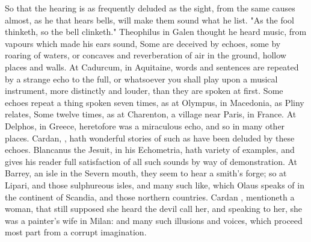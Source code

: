 {So that the hearing is as frequently deluded as the sight, from the same causes
almost, as he that hears bells, will make them sound what he list. "As the fool
thinketh, so the bell clinketh." Theophilus in Galen thought he heard music,
from vapours which made his ears sound, \etc{} Some are deceived by echoes,
some by roaring of waters, or concaves and reverberation of air in the ground,
hollow places and walls. At Cadurcum, in Aquitaine, words
and sentences are repeated by a strange echo to the full, or whatsoever you
shall play upon a musical instrument, more distinctly and louder, than they are
spoken at first. Some echoes repeat a thing spoken seven times, as at Olympus,
in Macedonia, as Pliny relates,  Some
twelve times, as at Charenton, a village near Paris, in France. At Delphos, in
Greece, heretofore was a miraculous echo, and so in many other places. Cardan,
, hath wonderful stories of such as have
been deluded by these echoes. Blancanus the Jesuit, in his Echometria, hath
variety of examples, and gives his reader full satisfaction of all such sounds
by way of demonstration. At Barrey, an isle in the Severn
mouth, they seem to hear a smith's forge; so at Lipari, and those sulphureous
isles, and many such like, which Olaus speaks of in the continent of Scandia,
and those northern countries. Cardan , mentioneth a woman, that still supposed she heard the devil call her,
and speaking to her, she was a painter's wife in Milan: and many such illusions
and voices, which proceed most part from a corrupt imagination.

}
